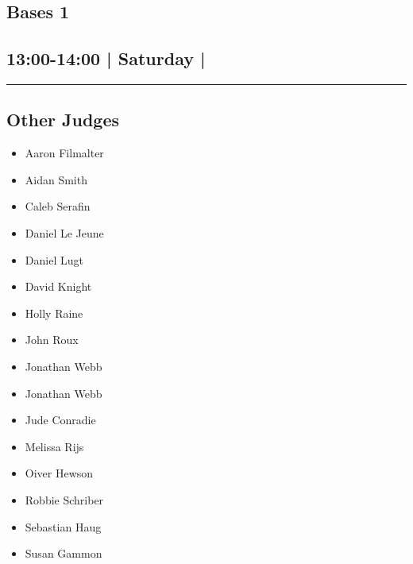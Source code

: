 \documentclass[10pt, A5]{article}
\begin{document}
		\begin{framed}
			\begin{minipage}{\textwidth}

			\setcounter{section}{27}
							\section{Bases 1}
						
			\subsection*{13:00-14:00 | Saturday | }

			\vspace{0.25cm}
			\hrule
			\vspace{0.25cm}


			\subsection*{Other Judges}
							

				\begin{multicols}{2}

			\begin{itemize}
											\item Aaron Filmalter
											\item Aidan Smith
											\item Caleb Serafin
											\item Daniel Le Jeune
											\item Daniel Lugt
											\item David Knight
											\item Holly Raine
											\item John Roux
											\item Jonathan Webb
								\end{itemize}

			\vfill\null
			\columnbreak

			\begin{itemize}
											\item Jonathan Webb
											\item Jude Conradie
											\item Melissa Rijs
											\item Oiver Hewson
											\item Robbie Schriber
											\item Sebastian Haug
											\item Susan Gammon
								\end{itemize}


\end{multicols}
\end{minipage}
\end{framed}
\end{document}
